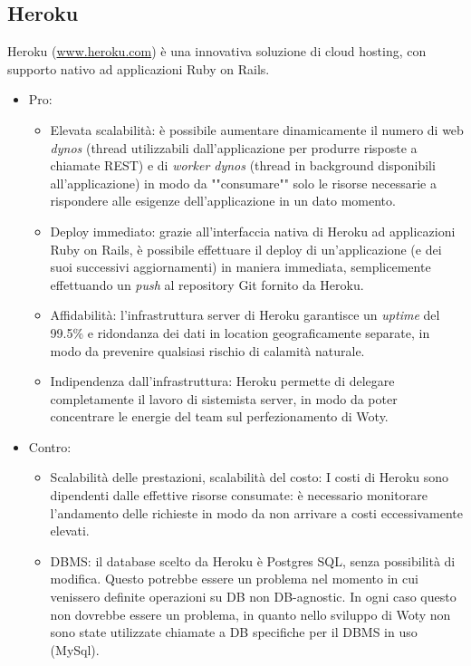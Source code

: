 \subsection{Heroku}
Heroku (\url{www.heroku.com}) è una innovativa soluzione di cloud hosting, con supporto nativo ad applicazioni Ruby on Rails.
\begin{itemize}
\item Pro:
\begin{itemize}
\item Elevata scalabilità: è possibile aumentare dinamicamente il numero di web \textit{dynos} (thread utilizzabili dall'applicazione per produrre risposte a chiamate REST) e di \textit{worker dynos} (thread in background disponibili all'applicazione) in modo da ""consumare"" solo le risorse necessarie a rispondere alle esigenze dell'applicazione in un dato momento.
\item Deploy immediato: grazie all'interfaccia nativa di Heroku ad applicazioni Ruby on Rails, è possibile effettuare il deploy di un'applicazione (e dei suoi successivi aggiornamenti) in maniera immediata, semplicemente effettuando un \emph{push} al repository Git fornito da Heroku. 
\item Affidabilità: l'infrastruttura server di Heroku garantisce un \textit{uptime} del 99.5\% e ridondanza dei dati in location geograficamente separate, in modo da prevenire qualsiasi rischio di calamità naturale. 
\item Indipendenza dall'infrastruttura: Heroku permette di delegare completamente il lavoro di sistemista server, in modo da poter concentrare le energie del team sul perfezionamento di Woty.
\end{itemize}
\item Contro:
\begin{itemize}
\item Scalabilità delle prestazioni, scalabilità del costo: I costi di Heroku sono dipendenti dalle effettive risorse consumate: è necessario monitorare l'andamento delle richieste in modo da non arrivare a costi eccessivamente elevati.
\item DBMS: il database scelto da Heroku è Postgres SQL, senza possibilità di modifica. Questo potrebbe essere un problema nel momento in cui venissero definite operazioni su DB non DB-agnostic. In ogni caso questo non dovrebbe essere un problema, in quanto nello sviluppo di Woty non sono state utilizzate chiamate a DB specifiche per il DBMS in uso (MySql).
\end{itemize}
\end{itemize}

